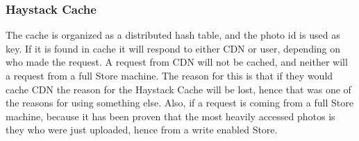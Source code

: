 \subsubsection{Haystack Cache}
  The cache is organized as a distributed hash table, and the photo id is used as key.
  If it is found in cache it will respond to either CDN or user, depending on who made
  the request. A request from CDN will not be cached, and neither will a request from a
  full Store machine. The reason for this is that if they would cache CDN the reason for
  the Haystack Cache will be lost, hence that was one of the reasons for using something
  else. Also, if a request is coming from a full Store machine, because it has been proven
  that the most heavily accessed photos is they who were just uploaded, hence from a write 
  enabled Store.